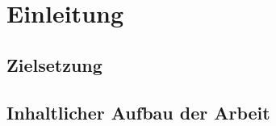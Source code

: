 
\chapter{Einleitung}

\cite{Misc1,book1}

\section{Zielsetzung}

\section{Inhaltlicher Aufbau der Arbeit}
